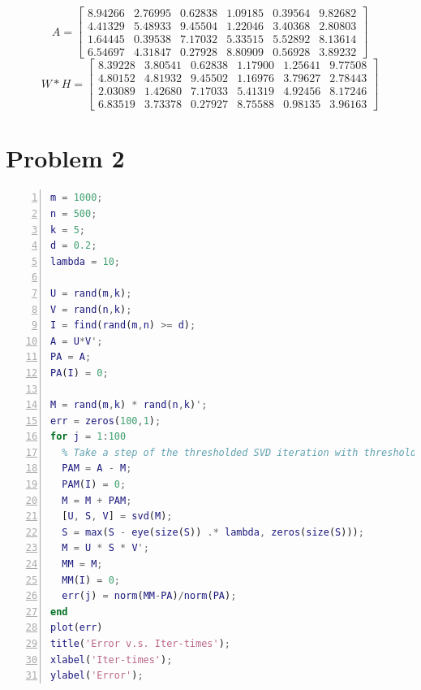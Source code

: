 \documentclass[a4paper, 11pt]{article}
\begin{document}
$$
A =
\begin{bmatrix}
	8.94266 &  2.76995 &  0.62838 &  1.09185 &  0.39564 &  9.82682 \\
   4.41329  &  5.48933 &  9.45504 &  1.22046 &  3.40368 &  2.80803 \\ 
   1.64445  &  0.39538 &  7.17032 &  5.33515 &  5.52892 &  8.13614 \\
   6.54697  &  4.31847 &  0.27928 &  8.80909 &  0.56928 &  3.89232
\end{bmatrix}
$$
$$
W * H = 
\begin{bmatrix}
   8.39228 &  3.80541 &  0.62838 &  1.17900 &  1.25641 &  9.77508 \\
   4.80152 &  4.81932 &  9.45502 &  1.16976 &  3.79627 &  2.78443 \\
   2.03089 &  1.42680 &  7.17033 &  5.41319 &  4.92456 &  8.17246 \\
   6.83519 &  3.73378 &  0.27927 &  8.75588 &  0.98135 &  3.96163 
\end{bmatrix}
$$



\newpage
\section*{Problem 2}


\begin{lstlisting}[language = Matlab, numbers=left,   
  numberstyle=\tiny,keywordstyle=\color{blue!70},  
  commentstyle=\color{red!50!green!50!blue!50},frame=shadowbox,  
  rulesepcolor=\color{red!20!green!20!blue!20},basicstyle=\ttfamily,
  tabsize=2]
m = 1000;
n = 500;
k = 5;
d = 0.2;
lambda = 10;

U = rand(m,k);
V = rand(n,k);
I = find(rand(m,n) >= d);
A = U*V';
PA = A;
PA(I) = 0;

M = rand(m,k) * rand(n,k)';
err = zeros(100,1);
for j = 1:100
  % Take a step of the thresholded SVD iteration with threshold lambda.
  PAM = A - M;
  PAM(I) = 0;
  M = M + PAM;
  [U, S, V] = svd(M);
  S = max(S - eye(size(S)) .* lambda, zeros(size(S)));
  M = U * S * V';
  MM = M;
  MM(I) = 0;
  err(j) = norm(MM-PA)/norm(PA);
end
plot(err)
title('Error v.s. Iter-times');
xlabel('Iter-times');
ylabel('Error');
\end{lstlisting}
\end{document}
